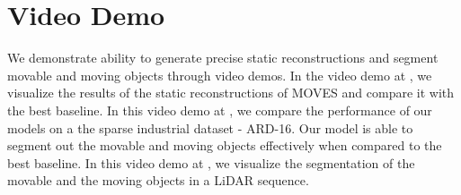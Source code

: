 \section{Video Demo}

We demonstrate \dslr{} ability to generate precise static reconstructions and segment movable and moving objects through video demos. In the video demo at \cite{url1}, we visualize the results of the static reconstructions of MOVES and compare it with the best baseline. In this video demo at \cite{url2}, we compare the performance of our models on a the sparse industrial dataset - ARD-16. Our model is able to segment out the movable and moving objects effectively when compared to the best baseline. In this video demo at \cite{url3}, we visualize the segmentation of the movable and the moving objects in a LiDAR sequence.

 
